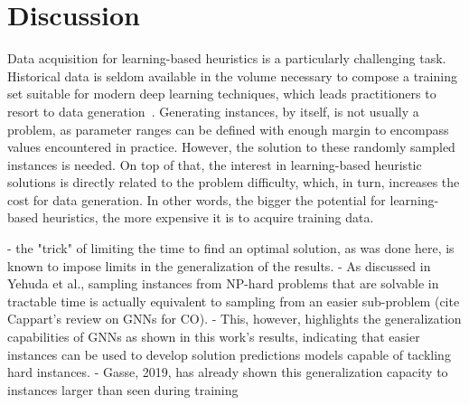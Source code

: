 

\chapter{Discussion}

Data acquisition for learning-based heuristics is a particularly challenging task. 
Historical data is seldom available in the volume necessary to compose a training set suitable for modern deep learning techniques, which leads practitioners to resort to data generation~\cite{bengioMachineLearningCombinatorial2021}.
Generating instances, by itself, is not usually a problem, as parameter ranges can be defined with enough margin to encompass values encountered in practice.
However, the solution to these randomly sampled instances is needed.
On top of that, the interest in learning-based heuristic solutions is directly related to the problem difficulty, which, in turn, increases the cost for data generation.
In other words, the bigger the potential for learning-based heuristics, the more expensive it is to acquire training data.

- the "trick" of limiting the time to find an optimal solution, as was done here, is known to impose limits in the generalization of the results.
- As discussed in Yehuda et al., sampling instances from NP-hard problems that are solvable in tractable time is actually equivalent to sampling from an easier sub-problem (cite Cappart's review on GNNs for CO). 
- This, however, highlights the generalization capabilities of GNNs as shown in this work's results, indicating that easier instances can be used to develop solution predictions models capable of tackling hard instances.
- Gasse, 2019, has already shown this generalization capacity to instances larger than seen during training

